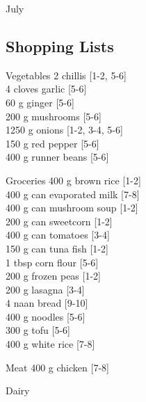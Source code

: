 \begin{menu}{July}
    \subsection*{Shopping Lists}
      \begin{shoppinglist}{Vegetables}
      2  chillis {\scriptsize[1-2, 5-6]}\\
      4 cloves garlic {\scriptsize[5-6]}\\
      60 g ginger {\scriptsize[5-6]}\\
      200 g mushrooms {\scriptsize[5-6]}\\
      1250 g onions {\scriptsize[1-2, 3-4, 5-6]}\\
      150 g red pepper {\scriptsize[5-6]}\\
      400 g runner beans {\scriptsize[5-6]}\\
      \end{shoppinglist}%
      \begin{shoppinglist}{Groceries}
      400 g brown rice {\scriptsize[1-2]}\\
      400 g can evaporated milk {\scriptsize[7-8]}\\
      400 g can mushroom soup {\scriptsize[1-2]}\\
      200 g can sweetcorn {\scriptsize[1-2]}\\
      400 g can tomatoes {\scriptsize[3-4]}\\
      150 g can tuna fish {\scriptsize[1-2]}\\
      1 tbsp corn flour {\scriptsize[5-6]}\\
      200 g frozen peas {\scriptsize[1-2]}\\
      200 g lasagna {\scriptsize[3-4]}\\
      4  naan bread {\scriptsize[9-10]}\\
      400 g noodles {\scriptsize[5-6]}\\
      300 g tofu {\scriptsize[5-6]}\\
      400 g white rice {\scriptsize[7-8]}\\
      \end{shoppinglist}%
      \par\vfil %
      \begin{shoppinglist}{Meat}
      400 g chicken {\scriptsize[7-8]}\\
      \end{shoppinglist}%
      \begin{shoppinglist}{Dairy}

\end{shoppinglist}
\end{menu}
